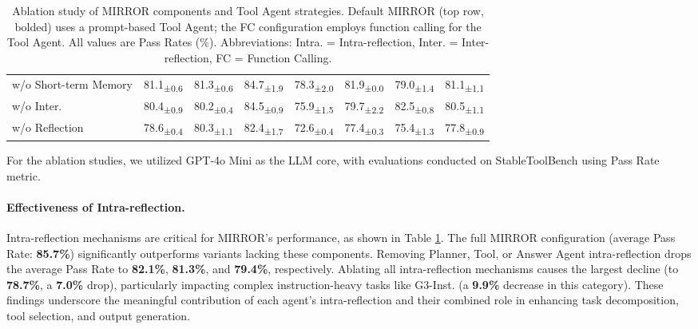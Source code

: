 \documentclass{article}
\begin{document}
\begin{table}[ht]
{\begin{tabular}{@{}lccccccc@{}}
\hspace{5mm} w/o Short-term Memory & 81.1\textsubscript{±0.6} & 81.3\textsubscript{±0.6} & 84.7\textsubscript{±1.9} & 78.3\textsubscript{±2.0} & 81.9\textsubscript{±0.0} & 79.0\textsubscript{±1.4} & 81.1\textsubscript{±1.1} \\
\hspace{5mm} w/o Inter. & 80.4\textsubscript{±0.9} & 80.2\textsubscript{±0.4} & 84.5\textsubscript{±0.9} & 75.9\textsubscript{±1.5} & 79.7\textsubscript{±2.2} & 82.5\textsubscript{±0.8} & 80.5\textsubscript{±1.1} \\
\midrule
\hspace{5mm} w/o Reflection & 78.6\textsubscript{±0.4} & 80.3\textsubscript{±1.1} & 82.4\textsubscript{±1.7} & 72.6\textsubscript{±0.4} & 77.4\textsubscript{±0.3} & 75.4\textsubscript{±1.3} & 77.8\textsubscript{±0.9} \\
\bottomrule
\end{tabular}
}
\caption{Ablation study of MIRROR components and Tool Agent strategies. Default MIRROR (top row, bolded) uses a prompt-based Tool Agent; the FC configuration employs function calling for the Tool Agent. All values are Pass Rates (\%). Abbreviations: Intra. = Intra-reflection, Inter. = Inter-reflection, FC = Function Calling.}
\label{tab:mirror_variants_performance} 
\end{table}

For the ablation studies, we utilized GPT-4o Mini as the LLM core, with evaluations conducted on StableToolBench using Pass Rate metric.

\paragraph{Effectiveness of Intra-reflection.} 
Intra-reflection mechanisms are critical for MIRROR's performance, as shown in Table \ref{tab:mirror_variants_performance}. The full MIRROR configuration (average Pass Rate: \textbf{85.7\%}) significantly outperforms variants lacking these components. Removing Planner, Tool, or Answer Agent intra-reflection drops the average Pass Rate to \textbf{82.1\%}, \textbf{81.3\%}, and \textbf{79.4\%}, respectively. Ablating all intra-reflection mechanisms causes the largest decline (to \textbf{78.7\%}, a \textbf{7.0\%} drop), particularly impacting complex instruction-heavy tasks like G3-Inst. (a \textbf{9.9\%} decrease in this category). These findings underscore the meaningful contribution of each agent's intra-reflection and their combined role in enhancing task decomposition, tool selection, and output generation.
\end{document}
